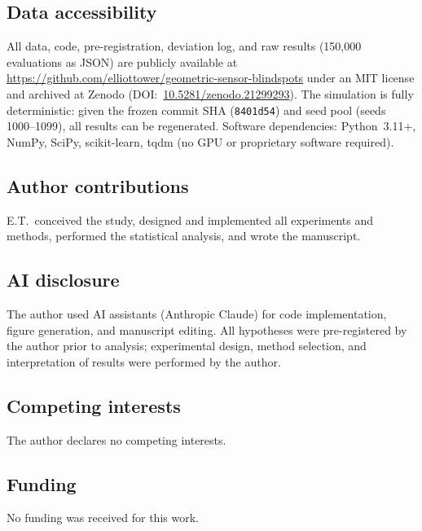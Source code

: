 \documentclass[11pt]{article}
\begin{document}
\subsection*{Data accessibility}

All data, code, pre-registration, deviation log, and raw results
(150,000 evaluations as JSON) are publicly available at
\url{https://github.com/elliottower/geometric-sensor-blindspots}
under an MIT license and archived at Zenodo
(DOI:~\href{https://doi.org/10.5281/zenodo.21299293}{10.5281/zenodo.21299293}).  The simulation is fully deterministic: given
the frozen commit SHA (\texttt{8401d54}) and seed pool (seeds
1000--1099), all results can be regenerated.  Software dependencies:
Python~3.11+, NumPy, SciPy, scikit-learn, tqdm (no GPU or proprietary
software required).

\subsection*{Author contributions}

E.T.\ conceived the study, designed and implemented all experiments and
methods, performed the statistical analysis, and wrote the manuscript.

\subsection*{AI disclosure}

The author used AI assistants (Anthropic Claude) for code implementation,
figure generation, and manuscript editing.  All hypotheses were
pre-registered by the author prior to analysis; experimental design,
method selection, and interpretation of results were performed by the
author.

\subsection*{Competing interests}

The author declares no competing interests.

\subsection*{Funding}

No funding was received for this work.



\end{document}

